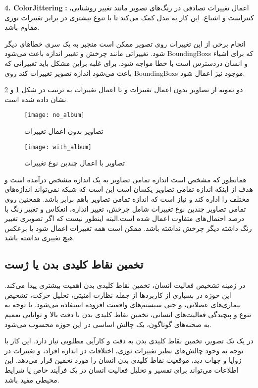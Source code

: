 \textbf{4.  \gls{ColorJittering}}
\textbf{:}
اعمال تغییرات تصادفی در رنگ‌های تصویر مانند تغییر روشنایی، کنتراست و اشباع. این کار به مدل کمک می‌کند تا با تنوع بیشتری در برابر تغییرات نوری مقاوم باشد.

انجام برخی از این تغییرات روی تصویر ممکن است منجبر به یک سری خطاهای دیگر شود. تغییراتی مانند چرخش و تغییر اندازه باعث می‌شود %
\glspl{BoundingBox}
که برای اشیاء و انسان دردسترس است با خطا مواجه شود. برای غلبه براین مشکل باید تغییراتی که باعث می‌شود اندازه تصویر تغییرات کند روی %
\glspl{BoundingBox}
 موجود نیز اعمال شود. 

دو نمونه از تصاویر بدون اعمال تغییرات و با اعمال تغییرات به ترتیب در شکل %
 \ref{fig:no_album}
 و
\ref{fig:with_album}
نشان داده شده است.
\begin{figure}[ht]
	\centerline{\texttt{[image: no\_album]}}
	\caption{تصاویر بدون اعمال تغییرات}
	\label{fig:no_album}
\end{figure}
\begin{figure}[ht]
	\centerline{\texttt{[image: with\_album]}}
	\caption{تصاویر با اعمال چندین نوع تغییرات}
	\label{fig:with_album}
\end{figure}
همانطور که مشخص است اندازه تمامی تصاویر به یک اندازه مشخص درآمده است و هدف از اینکه اندازه تمامی تصاویر یکسان است این است که شبکه نمی‌تواند اندازه‌های مختلف را اداره کند و نیاز است که اندازه تمامی تصاویر باهم برابر باشد. همچنین روی تمامی تصاویر چندین نوع تغییرات شامل چرخش، تغییر اندازه، انعکاس و تغییر رنگ با درصد احتمال‌های متفاوت اعمال شده است.البته اینطور نیست که اگر تصویری تغییر رنگ داشته دیگر چرخش نداشته باشد. ممکن است همه تغییرات اعمال شود یا برعکس هیچ تغییری نداشته باشد.

\subsection{تخمین نقاط کلیدی بدن یا ژست}

در زمینه تشخیص فعالیت انسان، تخمین نقاط کلیدی بدن اهمیت بیشتری پیدا می‌کند. این حوزه در بسیاری از کاربردها از جمله نظارت امنیتی، تحلیل حرکت، تشخیص بیماری‌های عضلانی، و حتی سیستم‌های واقعیت افزوده استفاده می‌شود. با توجه به تنوع و پیچیدگی فعالیت‌های انسانی، تخمین نقاط کلیدی بدن با دقت بالا و توانایی تعمیم به صحنه‌های گوناگون، یک چالش اساسی در این حوزه محسوب می‌شود.

در یک تک تصویر، تخمین نقاط کلیدی بدن به دقت و کارآیی مطلوبی نیاز دارد. این کار با توجه به وجود چالش‌های نظیر تغییرات نوری، اختلافات در اندازه افراد، و تغییرات در زوایا و جهات دید، موقعیت نقاط کلیدی بدن انسان را مورد تخمین قرار می‌دهد. این اطلاعات می‌تواند برای تفسیر و تحلیل فعالیت انسان در یک فرآیند خاص یا شرایط محیطی مفید باشد.

